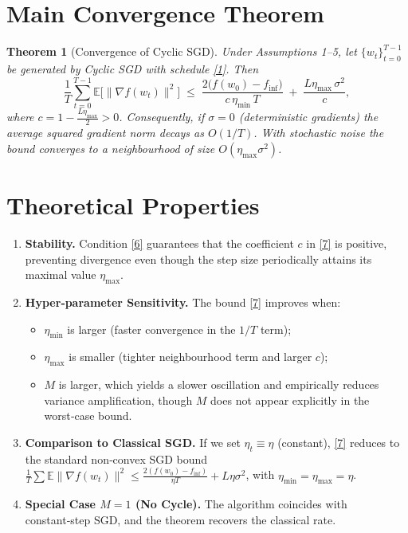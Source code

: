 \documentclass{article}
\newtheorem{theorem}{Theorem}
\newcommand{\E}{\mathbb{E}}
\begin{document}
\section*{Main Convergence Theorem}
\begin{theorem}[Convergence of Cyclic SGD]\label{thm:main}
Under Assumptions 1–5, let $\{w_t\}_{t=0}^{T-1}$ be generated by Cyclic SGD with schedule \eqref{1}. Then
\[
\frac{1}{T}\sum_{t=0}^{T-1}\E\!\big[\|\nabla f(w_t)\|^2\big]
\;\le\;
\frac{2\big(f(w_0)-f_{\inf}\big)}{c\,\eta_{\min}\,T}
\;+\;
\frac{L\eta_{\max}\,\sigma^2}{c},
\tag{7}
\]
where $c=1-\frac{L\eta_{\max}}{2}>0$.
Consequently, if $\sigma=0$ (deterministic gradients) the average squared gradient norm decays as $O(1/T)$. With stochastic noise the bound converges to a neighbourhood of size $O(\eta_{\max}\sigma^2)$.
\end{theorem}

\section*{Theoretical Properties}
\begin{enumerate}[label=\arabic*.]
\item \textbf{Stability.} Condition \eqref{6} guarantees that the coefficient $c$ in \eqref{7} is positive, preventing divergence even though the step size periodically attains its maximal value $\eta_{\max}$.
\item \textbf{Hyper‑parameter Sensitivity.} The bound \eqref{7} improves when:
    \begin{itemize}
        \item $\eta_{\min}$ is larger (faster convergence in the $1/T$ term);
        \item $\eta_{\max}$ is smaller (tighter neighbourhood term and larger $c$);
        \item $M$ is larger, which yields a slower oscillation and empirically reduces variance amplification, though $M$ does not appear explicitly in the worst‑case bound.
    \end{itemize}
\item \textbf{Comparison to Classical SGD.} If we set $\eta_t\equiv \eta$ (constant), \eqref{7} reduces to the standard non‑convex SGD bound 
    $\frac{1}{T}\sum\E\|\nabla f(w_t)\|^2\le \frac{2(f(w_0)-f_{\inf})}{\eta T}+L\eta\sigma^2$, 
    with $\eta_{\min}=\eta_{\max}=\eta$.
\item \textbf{Special Case $M=1$ (No Cycle).} The algorithm coincides with constant‑step SGD, and the theorem recovers the classical rate.
\end{enumerate}
\end{document}
